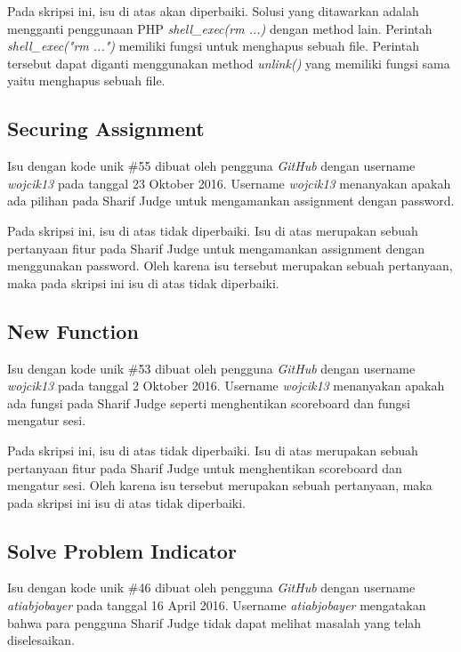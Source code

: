 Pada skripsi ini, isu di atas akan diperbaiki. Solusi yang ditawarkan adalah mengganti penggunaan PHP \textit{shell\_exec(rm ...)} dengan method lain.  Perintah \textit{shell\_exec("rm ...")} memiliki fungsi untuk menghapus sebuah file. Perintah tersebut dapat diganti menggunakan method \textit{unlink()} yang memiliki fungsi sama yaitu menghapus sebuah file.

\subsection{Securing Assignment}
Isu dengan kode unik \#55 dibuat oleh pengguna \textit{GitHub} dengan username \textit{wojcik13} pada tanggal 23 Oktober 2016. Username \textit{wojcik13} menanyakan apakah ada pilihan pada Sharif Judge untuk mengamankan assignment dengan password.

Pada skripsi ini, isu di atas tidak diperbaiki. Isu di atas merupakan sebuah pertanyaan fitur pada Sharif Judge untuk mengamankan assignment dengan menggunakan password. Oleh karena isu tersebut merupakan sebuah pertanyaan, maka pada skripsi ini isu di atas tidak diperbaiki.

\subsection{New Function}
Isu dengan kode unik \#53 dibuat oleh pengguna \textit{GitHub} dengan username \textit{wojcik13} pada tanggal 2 Oktober 2016. Username \textit{wojcik13} menanyakan apakah ada fungsi pada Sharif Judge seperti menghentikan scoreboard dan fungsi mengatur sesi. 

Pada skripsi ini, isu di atas tidak diperbaiki. Isu di atas merupakan sebuah pertanyaan fitur pada Sharif Judge untuk menghentikan scoreboard dan mengatur sesi. Oleh karena isu tersebut merupakan sebuah pertanyaan, maka pada skripsi ini isu di atas tidak diperbaiki.

\subsection{Solve Problem Indicator}
Isu dengan kode unik \#46 dibuat oleh pengguna \textit{GitHub} dengan username \textit{atiabjobayer} pada tanggal 16 April 2016. Username \textit{atiabjobayer} mengatakan bahwa para pengguna Sharif Judge tidak dapat melihat masalah yang telah diselesaikan.

